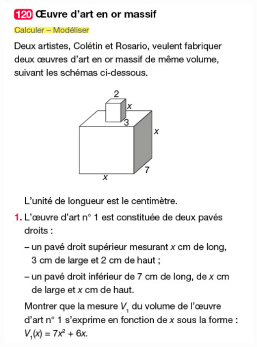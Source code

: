 \documentclass[9pt]{beamer}
\begin{document}
\begin{frame}
	\begin{multicols}{3}
		\includegraphics[width=\linewidth]{Images/Exercice 120 page 77 - question 1.png}

		\columnbreak


\end{multicols}
\end{frame}
\end{document}
